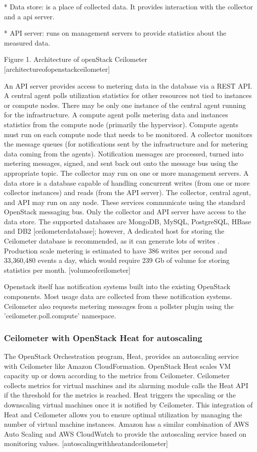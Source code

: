 \documentclass{sig-alternate}
\begin{document}
* Data store: is a place of collected data. It provides interaction with the collector and a api server.

* API server: runs on management servers to provide statistics about the measured data.

Figure 1. Architecture of openStack Ceilometer [architectureofopenstackceilometer]

An API server provides access to metering data in the database via a REST API. A central agent polls utilization statistics for other resources not tied to instances or compute nodes. There may be only one instance of the central agent running for the infrastructure. A compute agent polls metering data and instances statistics from the compute node (primarily the hypervisor). Compute agents must run on each compute node that needs to be monitored. A collector monitors the message queues (for notifications sent by the infrastructure and for metering data coming from the agents). Notification messages are processed, turned into metering messages, signed, and sent back out onto the message bus using the appropriate topic. The collector may run on one or more management servers. A data store is a database capable of handling concurrent writes (from one or more collector instances) and reads (from the API server). The collector, central agent, and API may run on any node. These services communicate using the standard OpenStack messaging bus. Only the collector and API server have access to the data store. The supported databases are MongoDB, MySQL, PostgreSQL, HBase and DB2 [ceilometerdatabase]; however, A dedicated host for storing the Ceilometer database is recommended, as it can generate lots of writes . Production scale metering is estimated to have 386 writes per second and 33,360,480 events a day, which would require 239 Gb of volume for storing statistics per month. [volumeofceilometer]

Openstack itself has notification systems built into the existing OpenStack components. Most usage data are collected from these notification systems. Ceilometer also requests metering messages from a pollster plugin using the 'ceilometer.poll.compute' namespace.

\subsubsection{Ceilometer with OpenStack Heat for autoscaling}

The OpenStack Orchestration program, Heat, provides an autoscaling service with Ceilometer like Amazon CloudFormation. OpenStack Heat scales VM capacity up or down according to the metrics from Ceilometer. Ceilometer collects metrics for virtual machines and its alarming module calls the Heat API if the threshold for the metrics is reached. Heat triggers the upscaling or the downscaling virtual machines once it is notified by Ceilometer. This integration of Heat and Ceilometer allows you to ensure optimal utilization by managing the number of virtual machine instances. Amazon has a similar combination of AWS Auto Scaling and AWS CloudWatch to provide the autoscaling service based on monitoring values. [autoscalingwithheatandceilometer]
\end{document}
